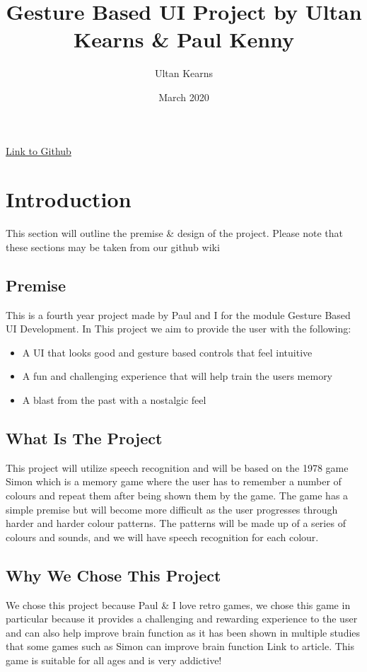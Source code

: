 \documentclass{article}
\title{Gesture Based UI Project by Ultan Kearns \& Paul Kenny}
\author{Ultan Kearns}
\date{March 2020}
\begin{document}
\maketitle
\begin{center}
\href{https://github.com/Ultan-Kearns/GestureBasedUIProject}{Link to Github}
\end{center}
\newpage
\tableofcontents
\newpage

\section{Introduction}
This section will outline the premise \& design of the project. Please note that these sections may be taken from our github wiki\cite{githubwiki}
\subsection{Premise}
This is a fourth year project made by Paul and I for the module Gesture Based UI Development. In This project we aim to provide the user with the following:
    \begin{itemize}
    \item A UI that looks good and gesture based controls that feel intuitive
    \item A fun and challenging experience that will help train the users memory
    \item A blast from the past with a nostalgic feel
    \end{itemize}{}
\subsection{What Is The Project}
This project will utilize speech recognition and will be based on the 1978 game Simon\cite{Simon} which is a memory game where the user has to remember a number of colours and repeat them after being shown them by the game. The game has a simple premise but will become more difficult as the user progresses through harder and harder colour patterns. The patterns will be made up of a series of colours and sounds, and we will have speech recognition for each colour.
\subsection{Why We Chose This Project}
We chose this project because Paul \& I love retro games, we chose this game in particular because it provides a challenging and rewarding experience to the user and can also help improve brain function as it has been shown in multiple studies that some games such as Simon can improve brain function Link to article. This game is suitable for all ages and is very addictive!
\end{document}
